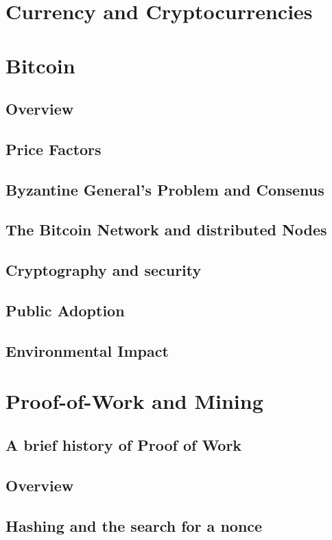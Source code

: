 \documentclass[11pt]{article} %
\begin{document}
\section{Currency and Cryptocurrencies}{}

\section{Bitcoin}{}
\subsection{Overview}{}
\subsection{Price Factors}{}
\subsection{Byzantine General's Problem and Consenus}{}
\subsection{The Bitcoin Network and distributed Nodes}{}
\subsection{Cryptography and security}{}
\subsection{Public Adoption}{}
\subsection{Environmental Impact}{}


\section{Proof-of-Work and Mining}{}
\subsection{A brief history of Proof of Work}
\subsection{Overview}
\subsection{Hashing and the search for a nonce}
\end{document}
